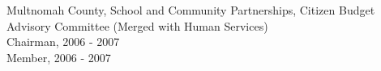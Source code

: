 \documentclass[Computer Science]{vita}
\begin{document}
\begin{vita}
\begin{Selected Professional and Service Activities}
\begin{Community}
    \item Multnomah County, School and Community Partnerships, Citizen Budget Advisory Committee (Merged with Human Services)\\
      Chairman, 2006 - 2007\\
      Member, 2006 - 2007
	
    \end{Community}
  
  \end{Selected Professional and Service Activities}


% 
% 

\end{vita}
\end{document}
